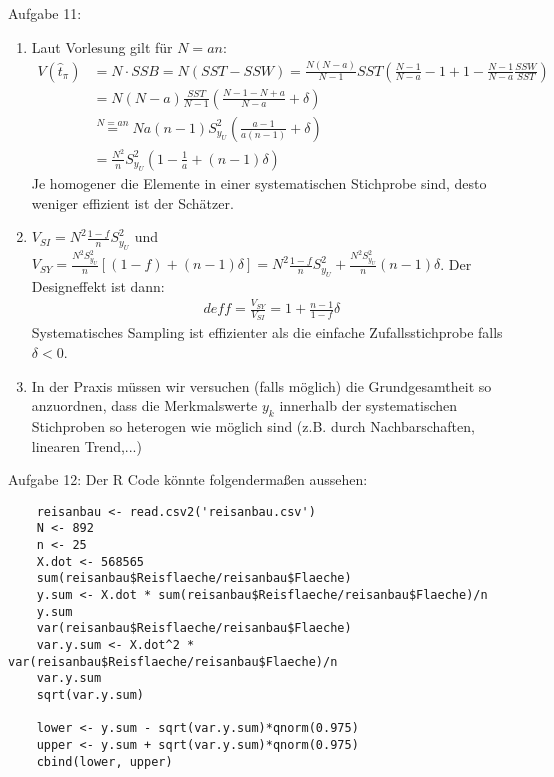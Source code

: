 \begin{Solution}{{Aufgabe 11:}}
\begin{enumerate}
\item Laut Vorlesung gilt für $N=an$:
\begin{align*}
V(\hat{t}_\pi) &= N\cdot SSB = N(SST-SSW) =\frac{N(N-a)}{N-1}SST \left(\frac{N-1}{N-a}-1 +1 -\frac{N-1}{N-a}\frac{SSW}{SST}\right)\\
&= N(N -a)\frac{SST}{N-1}\left(\frac{N-1 -N +a}{N-a} +\delta\right)\\
& \overset{N=an}{=} Na(n-1) S_{y_U}^2 \left(\frac{a-1}{a(n-1)}+\delta\right)\\
& = \frac{N^2}{n} S_{y_U}^2 \left(1-\frac{1}{a}+(n-1)\delta\right)
\end{align*}
Je homogener die Elemente in einer systematischen Stichprobe sind, desto weniger effizient ist der Schätzer.
\item $V_{SI} = N^2\frac{1-f}{n}S_{y_U}^2$ und $V_{SY} = \frac{N^2 S_{y_U}^2}{n} [(1-f)+(n-1)\delta] = N^2\frac{1-f}{n}S_{y_U}^2 + \frac{N^2 S_{y_U}^2}{n}(n-1)\delta$. Der Designeffekt ist dann:
\begin{align*}
deff = \frac{V_{SY}}{V_{SI}} = 1 + \frac{n-1}{1-f}\delta
\end{align*}
Systematisches Sampling ist effizienter als die einfache Zufallsstichprobe falls $\delta <0$.
\item In der Praxis müssen wir versuchen (falls möglich) die Grundgesamtheit so anzuordnen, dass die Merkmalswerte $y_k$ innerhalb der systematischen Stichproben so heterogen wie möglich sind (z.B. durch Nachbarschaften, linearen Trend,...)
\end{enumerate}
\end{Solution}
\begin{Solution}{{Aufgabe 12:}}
Der R Code könnte folgendermaßen aussehen:
	\begin{lstlisting}
	reisanbau <- read.csv2('reisanbau.csv')
	N <- 892
	n <- 25
	X.dot <- 568565
	sum(reisanbau$Reisflaeche/reisanbau$Flaeche)
	y.sum <- X.dot * sum(reisanbau$Reisflaeche/reisanbau$Flaeche)/n
	y.sum
	var(reisanbau$Reisflaeche/reisanbau$Flaeche)
	var.y.sum <- X.dot^2 * var(reisanbau$Reisflaeche/reisanbau$Flaeche)/n
	var.y.sum
	sqrt(var.y.sum)

	lower <- y.sum - sqrt(var.y.sum)*qnorm(0.975)
	upper <- y.sum + sqrt(var.y.sum)*qnorm(0.975)
	cbind(lower, upper)
	\end{lstlisting}
\end{Solution}
